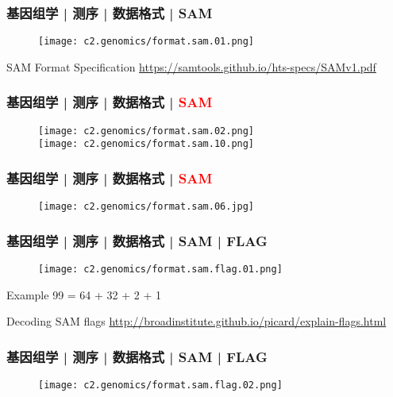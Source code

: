 \begin{frame}
  \frametitle{基因组学 | 测序 | 数据格式 | SAM}
  \begin{figure}
    \centering
    \texttt{[image: c2.genomics/format.sam.01.png]}
  \end{figure}
  \begin{block}{SAM Format Specification}
    \href{https://samtools.github.io/hts-specs/SAMv1.pdf}{https://samtools.github.io/hts-specs/SAMv1.pdf}
  \end{block}
\end{frame}

\begin{frame}
  \frametitle{基因组学 | 测序 | 数据格式 | \textcolor{red}{SAM}}
  \begin{figure}
    \centering
    \texttt{[image: c2.genomics/format.sam.02.png]}\\
    \vspace{1em}
    \texttt{[image: c2.genomics/format.sam.10.png]}
  \end{figure}
\end{frame}

\begin{frame}
  \frametitle{基因组学 | 测序 | 数据格式 | \textcolor{red}{SAM}}
  \begin{figure}
    \centering
    \texttt{[image: c2.genomics/format.sam.06.jpg]}
  \end{figure}
\end{frame}

\begin{frame}
  \frametitle{基因组学 | 测序 | 数据格式 | SAM | FLAG}
  \begin{figure}
    \centering
    \texttt{[image: c2.genomics/format.sam.flag.01.png]}
  \end{figure}
  \begin{block}{Example}
    99 = 64 + 32 + 2 + 1
  \end{block}
  \begin{block}{Decoding SAM flags}
  \href{http://broadinstitute.github.io/picard/explain-flags.html}{http://broadinstitute.github.io/picard/explain-flags.html}
  \end{block}
\end{frame}

\begin{frame}
  \frametitle{基因组学 | 测序 | 数据格式 | SAM | FLAG}
  \begin{figure}
    \centering
    \texttt{[image: c2.genomics/format.sam.flag.02.png]}
  \end{figure}
\end{frame}

